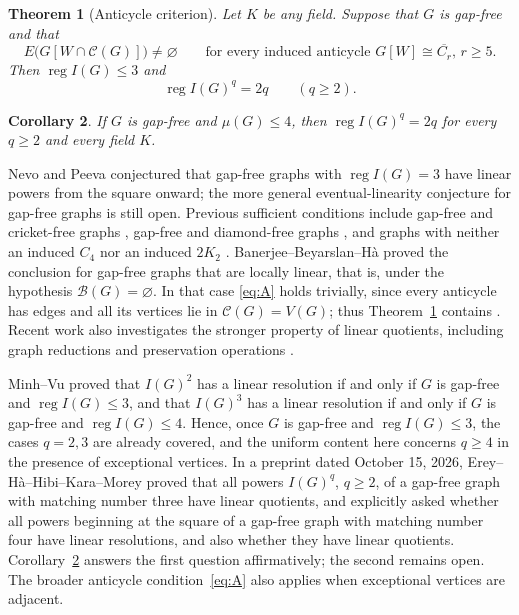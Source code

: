 \documentclass[11pt,a4paper]{article}
\newtheorem{theorem}{Theorem}[section]
\newtheorem{corollary}[theorem]{Corollary}
\theoremstyle{remark}\newtheorem{remark}[theorem]{Remark}
\newcommand{\reg}{\operatorname{reg}}
\newcommand{\Bad}{\mathcal B}
\newcommand{\Good}{\mathcal C}
\begin{document}
\begin{theorem}[Anticycle criterion]\label{thm:main}
Let $K$ be any field. Suppose that $G$ is gap-free and that
\begin{equation}\tag{A}\label{eq:A}
  E\bigl(G[W\cap\Good(G)]\bigr)\ne\varnothing
  \qquad\text{for every induced anticycle $G[W]\cong\overline{C_r}$, $r\ge5$.}
\end{equation}
Then $\reg I(G)\le3$ and
\[
 \boxed{\reg I(G)^q=2q\qquad(q\ge2)}.
\]
\end{theorem}

\begin{corollary}\label{cor:matching}
If $G$ is gap-free and $\mu(G)\le4$, then $\reg I(G)^q=2q$ for every $q\ge2$ and every field $K$.
\end{corollary}

Nevo and Peeva \cite{NP} conjectured that gap-free graphs with $\reg I(G)=3$ have linear powers from the square onward; the more general eventual-linearity conjecture for gap-free graphs is still open. Previous sufficient conditions include gap-free and cricket-free graphs \cite{Banerjee}, gap-free and diamond-free graphs \cite{EreyDiamond}, and graphs with neither an induced $C_4$ nor an induced $2K_2$ \cite{EreyC4}. Banerjee--Beyarslan--H\`a \cite[Theorem 4.5]{BBH} proved the conclusion for gap-free graphs that are locally linear, that is, under the hypothesis $\Bad(G)=\varnothing$. In that case \eqref{eq:A} holds trivially, since every anticycle has edges and all its vertices lie in $\Good(G)=V(G)$; thus Theorem~\ref{thm:main} contains \cite[Theorem 4.5]{BBH}. Recent work also investigates the stronger property of linear quotients, including graph reductions and preservation operations \cite{EFFHKM,EHHKM}.

Minh--Vu \cite{MV} proved that $I(G)^2$ has a linear resolution if and only if $G$ is gap-free and $\reg I(G)\le3$, and that $I(G)^3$ has a linear resolution if and only if $G$ is gap-free and $\reg I(G)\le4$. Hence, once $G$ is gap-free and $\reg I(G)\le3$, the cases $q=2,3$ are already covered, and the uniform content here concerns $q\ge4$ in the presence of exceptional vertices. In a preprint dated October 15, 2026, Erey--H\`a--Hibi--Kara--Morey proved that all powers $I(G)^q$, $q\ge2$, of a gap-free graph with matching number three have linear quotients, and \cite[Question 5.1]{EHHKM} explicitly asked whether all powers beginning at the square of a gap-free graph with matching number four have linear resolutions, and also whether they have linear quotients. Corollary~\ref{cor:matching} answers the first question affirmatively; the second remains open. The broader anticycle condition~\eqref{eq:A} also applies when exceptional vertices are adjacent.
\end{document}
